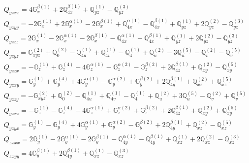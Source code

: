 \documentclass[fleqn,8pt,landscape]{jsarticle}
\begin{document}
\begin{align*}
& Q_{yzxx} = 4 \mathbb{G}_{x}^{\beta(1)} + 2 \mathbb{Q}_{4x}^{\beta(1)} + \mathbb{Q}_{yz}^{(1)} - \mathbb{Q}_{yz}^{(3)} \\
& Q_{yzyy} = - 2 \mathbb{G}_{x}^{(1)} + 2 \mathbb{G}_{x}^{\alpha(1)} - 2 \mathbb{G}_{x}^{\beta(1)} + \mathbb{Q}_{4x}^{\alpha(1)} - \mathbb{Q}_{4x}^{\beta(1)} + \mathbb{Q}_{yz}^{(1)} + 2 \mathbb{Q}_{yz}^{(2)} - \mathbb{Q}_{yz}^{(3)} \\
& Q_{yzzz} = 2 \mathbb{G}_{x}^{(1)} - 2 \mathbb{G}_{x}^{\alpha(1)} - 2 \mathbb{G}_{x}^{\beta(1)} - \mathbb{Q}_{4x}^{\alpha(1)} - \mathbb{Q}_{4x}^{\beta(1)} + \mathbb{Q}_{yz}^{(1)} + 2 \mathbb{Q}_{yz}^{(2)} - \mathbb{Q}_{yz}^{(3)} \\
& Q_{yzyz} = \mathbb{G}_{xyz}^{(2)} + \mathbb{Q}_{0}^{(2)} - \mathbb{Q}_{4u}^{(1)} + \mathbb{Q}_{4v}^{(1)} - \mathbb{Q}_{4}^{(1)} + \mathbb{Q}_{u}^{(2)} - 3 \mathbb{Q}_{u}^{(5)} - \mathbb{Q}_{v}^{(2)} - \mathbb{Q}_{v}^{(5)} \\
& Q_{yzzx} = - \mathbb{G}_{z}^{(1)} + \mathbb{G}_{z}^{(4)} - 4 \mathbb{G}_{z}^{\alpha(1)} - \mathbb{G}_{z}^{\alpha(2)} - \mathbb{G}_{z}^{\beta(2)} + 2 \mathbb{Q}_{4z}^{\beta(1)} + \mathbb{Q}_{xy}^{(2)} - \mathbb{Q}_{xy}^{(5)} \\
& Q_{yzxy} = \mathbb{G}_{y}^{(1)} + \mathbb{G}_{y}^{(4)} + 4 \mathbb{G}_{y}^{\alpha(1)} - \mathbb{G}_{y}^{\alpha(2)} + \mathbb{G}_{y}^{\beta(2)} + 2 \mathbb{Q}_{4y}^{\beta(1)} + \mathbb{Q}_{xz}^{(2)} + \mathbb{Q}_{xz}^{(5)} \\
& Q_{yzzy} = - \mathbb{G}_{xyz}^{(2)} + \mathbb{Q}_{0}^{(2)} - \mathbb{Q}_{4u}^{(1)} + \mathbb{Q}_{4v}^{(1)} - \mathbb{Q}_{4}^{(1)} + \mathbb{Q}_{u}^{(2)} + 3 \mathbb{Q}_{u}^{(5)} - \mathbb{Q}_{v}^{(2)} + \mathbb{Q}_{v}^{(5)} \\
& Q_{yzxz} = - \mathbb{G}_{z}^{(1)} - \mathbb{G}_{z}^{(4)} - 4 \mathbb{G}_{z}^{\alpha(1)} + \mathbb{G}_{z}^{\alpha(2)} + \mathbb{G}_{z}^{\beta(2)} + 2 \mathbb{Q}_{4z}^{\beta(1)} + \mathbb{Q}_{xy}^{(2)} + \mathbb{Q}_{xy}^{(5)} \\
& Q_{yzyx} = \mathbb{G}_{y}^{(1)} - \mathbb{G}_{y}^{(4)} + 4 \mathbb{G}_{y}^{\alpha(1)} + \mathbb{G}_{y}^{\alpha(2)} - \mathbb{G}_{y}^{\beta(2)} + 2 \mathbb{Q}_{4y}^{\beta(1)} + \mathbb{Q}_{xz}^{(2)} - \mathbb{Q}_{xz}^{(5)} \\
& Q_{zxxx} = 2 \mathbb{G}_{y}^{(1)} - 2 \mathbb{G}_{y}^{\alpha(1)} - 2 \mathbb{G}_{y}^{\beta(1)} - \mathbb{Q}_{4y}^{\alpha(1)} - \mathbb{Q}_{4y}^{\beta(1)} + \mathbb{Q}_{xz}^{(1)} + 2 \mathbb{Q}_{xz}^{(2)} - \mathbb{Q}_{xz}^{(3)} \\
& Q_{zxyy} = 4 \mathbb{G}_{y}^{\beta(1)} + 2 \mathbb{Q}_{4y}^{\beta(1)} + \mathbb{Q}_{xz}^{(1)} - \mathbb{Q}_{xz}^{(3)} \\

\end{align*}
\end{document}
